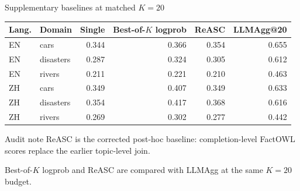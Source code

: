 \documentclass[aspectratio=169,10pt]{beamer}
\newcommand{\LLMAgg}{\textsf{LLMAgg}}
\begin{document}
\begin{frame}{Supplementary baselines at matched $K=20$}
  \small
  \begin{center}
  \color{ink}
  \begin{tabular}{@{}llrrrr@{}}
    \toprule
    \textbf{Lang.} & \textbf{Domain} & \textbf{Single} & \textbf{Best-of-$K$ logprob} & \textbf{ReASC} & \textbf{\LLMAgg{}@20}\\
    \midrule
    EN & cars      & 0.344 & 0.366 & 0.354 & 0.655\\
    EN & disasters & 0.287 & 0.324 & 0.305 & 0.612\\
    EN & rivers    & 0.211 & 0.221 & 0.210 & 0.463\\
    \midrule
    ZH & cars      & 0.349 & 0.407 & 0.349 & 0.633\\
    ZH & disasters & 0.354 & 0.417 & 0.368 & 0.616\\
    ZH & rivers    & 0.269 & 0.302 & 0.277 & 0.442\\
    \bottomrule
  \end{tabular}
  \end{center}
  \vspace{5pt}
  \begin{alertblock}{Audit note}
    \small ReASC is the corrected post-hoc baseline: completion-level FactOWL scores replace the earlier topic-level join.
  \end{alertblock}
  \centering
  {\footnotesize Best-of-$K$ logprob and ReASC are compared with LLMAgg at the same $K=20$ budget.}
\end{frame}
\end{document}
